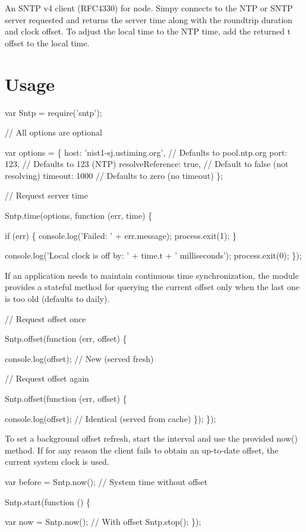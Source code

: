 An S\+N\+TP v4 client (R\+F\+C4330) for node. Simpy connects to the N\+TP or S\+N\+TP server requested and returns the server time along with the roundtrip duration and clock offset. To adjust the local time to the N\+TP time, add the returned {\ttfamily t} offset to the local time.

\href{http://travis-ci.org/hueniverse/sntp}{\tt }

\section*{Usage}


\begin{DoxyCode}
var Sntp = require('sntp');

// All options are optional

var options = \{
    host: 'nist1-sj.ustiming.org',  // Defaults to pool.ntp.org
    port: 123,                      // Defaults to 123 (NTP)
    resolveReference: true,         // Default to false (not resolving)
    timeout: 1000                   // Defaults to zero (no timeout)
\};

// Request server time

Sntp.time(options, function (err, time) \{

    if (err) \{
        console.log('Failed: ' + err.message);
        process.exit(1);
    \}

    console.log('Local clock is off by: ' + time.t + ' milliseconds');
    process.exit(0);
\});
\end{DoxyCode}


If an application needs to maintain continuous time synchronization, the module provides a stateful method for querying the current offset only when the last one is too old (defaults to daily).


\begin{DoxyCode}
// Request offset once

Sntp.offset(function (err, offset) \{

    console.log(offset);                    // New (served fresh)

    // Request offset again

    Sntp.offset(function (err, offset) \{

        console.log(offset);                // Identical (served from cache)
    \});
\});
\end{DoxyCode}


To set a background offset refresh, start the interval and use the provided now() method. If for any reason the client fails to obtain an up-\/to-\/date offset, the current system clock is used.


\begin{DoxyCode}
var before = Sntp.now();                    // System time without offset

Sntp.start(function () \{

    var now = Sntp.now();                   // With offset
    Sntp.stop();
\});
\end{DoxyCode}
 
